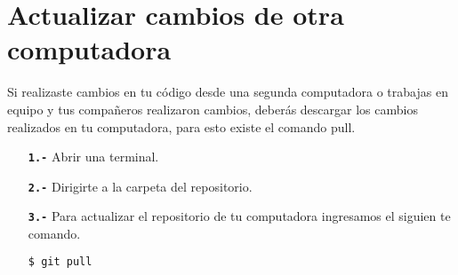\section{Actualizar cambios de otra computadora}
 Si realizaste cambios en tu código desde una segunda computadora o trabajas en equipo y tus compañeros realizaron cambios, deberás descargar los cambios realizados en tu computadora, para esto existe el comando pull.
 \begin{itemize}
 	\item[\textbf{\texttt{1.-}}] Abrir una terminal.
 	\item[\textbf{\texttt{2.-}}] Dirigirte a la carpeta del repositorio.
 	\item[\textbf{\texttt{3.-}}] Para actualizar el repositorio de tu computadora ingresamos el siguien te comando.\begin{lstlisting}[language=bash, caption= Ejemplo. Hacer Pull]
 	$ git pull\end{lstlisting}
 \end{itemize}